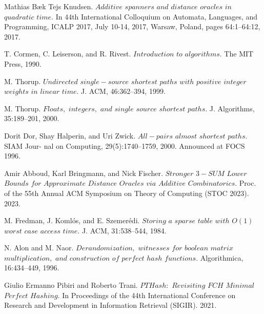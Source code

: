 \documentclass[shortabstract, lic, english]{iithesis}
\theoremstyle{definition} \newtheorem{definition}{Definition}[chapter]
\theoremstyle{remark} \newtheorem{remark}[definition]{Observation}
\theoremstyle{plain} \newtheorem{theorem}[definition]{Theorem}
\theoremstyle{plain} \newtheorem{lemma}[definition]{Lemma}
\theoremstyle{plain} \newtheorem{conjecture}[definition]{Conjecture}
\begin{document}
\begin{thebibliography}{1}
Mathias Bæk Tejs Knudsen. $Additive$ $spanners$ $and$ $distance$ $oracles$ $in$ $quadratic$ $time.$
In 44th International Colloquium on Automata, Languages, and Programming, ICALP
2017, July 10-14, 2017, Warsaw, Poland, pages 64:1–64:12, 2017.


T. Cormen, C. Leiserson, and R. Rivest. $Introduction$ $to$ $algorithms.$
The MIT Press, 1990.

M. Thorup. $Undirected$ $single-source$ $shortest$ $paths$ $with$ $positive$
$integer$ $weights$ $in$ $linear$ $time.$ J. ACM, 46:362–394, 1999.

M. Thorup. $Floats,$ $integers,$ $and$ $single$ $source$ $shortest$ $paths.$ J.
Algorithms, 35:189–201, 2000.

Dorit Dor, Shay Halperin, and Uri Zwick. $All-pairs$ $almost$ $shortest$ $paths.$ SIAM Jour-
nal on Computing, 29(5):1740–1759, 2000. Announced at FOCS 1996.

Amir Abboud, Karl Bringmann, and Nick Fischer. $Stronger$ $3-SUM$ $Lower$ $Bounds$ $for$
$Approximate$ $Distance$ $Oracles$ $via$ $Additive$ $Combinatorics.$ Proc. of the 55th Annual ACM
Symposium on Theory of Computing (STOC 2023). 2023.

M. Fredman, J. Koml\'os, and E. Szemer\'edi. $Storing$ $a$ $sparse$ $table$
$with$ $O(1)$ $worst$ $case$ $access$ $time.$ J. ACM, 31:538–544, 1984.

N. Alon and M. Naor. $Derandomization,$ $witnesses$ $for$ $boolean$
$matrix$ $multiplication,$ $and$ $construction$ $of$ $perfect$ $hash$ $functions.$
Algorithmica, 16:434–449, 1996.

Giulio Ermanno Pibiri and Roberto Trani. $PTHash:$ $Revisiting$ $FCH$ $Minimal$ $Perfect$ $Hashing.$
In Proceedings of the 44th International Conference on Research and Development in Information Retrieval (SIGIR). 2021.

\end{thebibliography}
\end{document}
